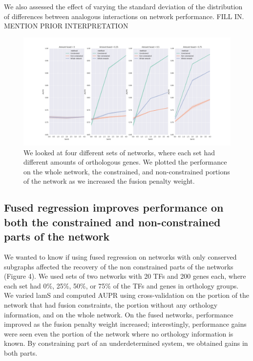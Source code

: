 \documentclass[11pt]{article}
\begin{document}
We also assessed the effect of varying the standard deviation of the distribution of differences between analogous interactions on network performance. FILL IN. MENTION PRIOR INTERPRETATION

\begin{figure}
\begin{center}
  \includegraphics[scale=0.45]{con_noncon.png}
  \caption{\label{fig:figure4} We looked at four different sets of networks, where each set had different amounts of orthologous genes. We plotted the performance on the whole network, the constrained, and non-constrained portions of the network as we increased the fusion penalty weight.}
  \end{center}
\end{figure}

\subsection{Fused regression improves performance on both the constrained and non-constrained parts of the network}
We wanted to know if using fused regression on networks with only conserved subgraphs affected the recovery of the non constrained parts of the networks (Figure 4). We used sets of two networks with 20 TFs and 200 genes each, where each set had 0\%, 25\%, 50\%, or 75\% of the TFs and genes in orthology groups. We varied lamS and computed AUPR using cross-validation on the portion of the network that had fusion constraints, the portion without any orthology information, and on the whole network. On the fused networks, performance improved as the fusion penalty weight increased; interestingly, performance gains were seen even the portion of the network where no orthology information is known. By constraining part of an underdetermined system, we obtained gains in both parts. 
\end{document}
